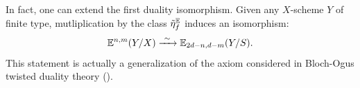 \begin{rem}
In fact, one can extend the first duality isomorphism.
 Given any $X$-scheme $Y$ of finite type, mutliplication by the class $\tilde \eta_f^\mathbb E$ induces an isomorphism:
$$
\mathbb E^{n,m}(Y/X) \xrightarrow{\ \sim\ } \mathbb E_{2d-n,d-m}(Y/S).
$$
This statement is actually a generalization of the axiom considered in Bloch-Ogus twisted duality theory
 (\cite{BlochOgus}).
\end{rem}
%
%
%
%
